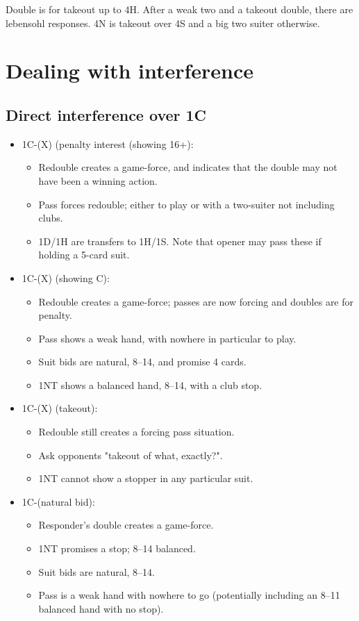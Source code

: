 \documentclass[a4paper,12pt]{article}
\begin{document}
Double is for takeout up to 4H. After a weak two and a takeout double, there
are lebensohl responses. 4N is takeout over 4S and a big two suiter otherwise.

\section{Dealing with interference}

\subsection{Direct interference over 1C}

\begin{itemize}
\item 1C-(X) (penalty interest (showing 16+):
	\begin{itemize}
   \item Redouble creates a game-force, and indicates that the double may not have been 
      a winning action.
   \item Pass forces redouble; either to play or with a two-suiter not including clubs.
   \item 1D/1H are transfers to 1H/1S.  Note that opener may pass these if holding a 5-card 
      suit.
	\end{itemize}
\item 1C-(X) (showing C):
	\begin{itemize}
   \item Redouble creates a game-force; passes are now forcing and doubles are for penalty.
   \item Pass shows a weak hand, with nowhere in particular to play.
   \item Suit bids are natural, 8--14, and promise 4 cards.
   \item 1NT shows a balanced hand, 8--14, with a club stop.
	\end{itemize}
\item 1C-(X) (takeout):
	\begin{itemize}
   \item Redouble still creates a forcing pass situation.
   \item Ask opponents "takeout of what, exactly?".
   \item 1NT cannot show a stopper in any particular suit.
	\end{itemize}
\item 1C-(natural bid):
	\begin{itemize}
   \item Responder's double creates a game-force.
   \item 1NT promises a stop; 8--14 balanced.
   \item Suit bids are natural, 8--14.
   \item Pass is a weak hand with nowhere to go (potentially including an 8--11 balanced hand with no stop).
	\end{itemize}
\end{itemize}
\end{document}
